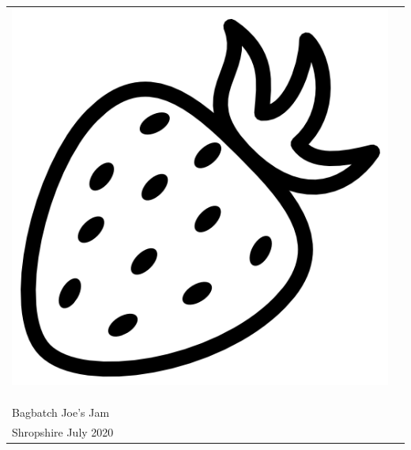\documentclass[12pt, a4paper]{letter}
\begin{document}
\newcommand\jamlabel{%
\rule{0mm}{10mm}
\begin{tabular}{@{}ll}%
\begin{minipage}{2.5cm}%
\includegraphics[scale=0.14]{jam-strawberry.png}
\end{minipage}%
&
\begin{minipage}{5cm}
  \textbf{\fontsize{18pt}{25pt}\selectfont Strawberry Jam}
  \\
  \textbf{}\hfill \\
  \scriptsize\\
  \strut\hfill \\
  Bagbatch \hfill Joe's Jam\\
  Shropshire \hfill July 2020
\end{minipage}
\end{tabular}
}%

\begin{labels}

%
{%
  \jamlabel
  
}%
\end{labels}
\end{document}
